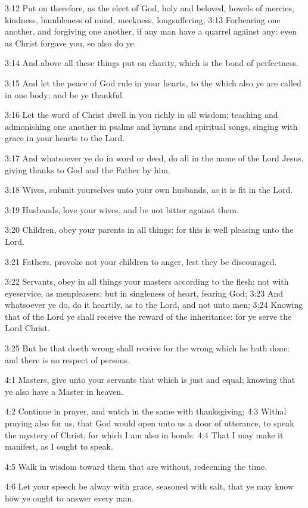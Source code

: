 3:12  Put on therefore, as the elect of God, holy and beloved, bowels of
mercies, kindness, humbleness of mind, meekness, longsuffering;
3:13  Forbearing one another, and forgiving one another, if any man have a
quarrel against any: even as Christ forgave you, so also do ye.

3:14  And above all these things put on charity, which is the bond of
perfectness.

3:15  And let the peace of God rule in your hearts, to the which also ye
are called in one body; and be ye thankful.

3:16  Let the word of Christ dwell in you richly in all wisdom; teaching
and admonishing one another in psalms and hymns and spiritual songs, singing
with grace in your hearts to the Lord.

3:17  And whatsoever ye do in word or deed, do all in the name of the Lord
Jesus, giving thanks to God and the Father by him.

3:18  Wives, submit yourselves unto your own husbands, as it is fit in the
Lord.

3:19  Husbands, love your wives, and be not bitter against them.

3:20  Children, obey your parents in all things: for this is well pleasing
unto the Lord.

3:21  Fathers, provoke not your children to anger, lest they be
discouraged.

3:22  Servants, obey in all things your masters according to the flesh; not
with eyeservice, as menpleasers; but in singleness of heart, fearing God;
3:23  And whatsoever ye do, do it heartily, as to the Lord, and not unto
men;
3:24  Knowing that of the Lord ye shall receive the reward of the
inheritance: for ye serve the Lord Christ.

3:25  But he that doeth wrong shall receive for the wrong which he hath
done: and there is no respect of persons.

4:1  Masters, give unto your servants that which is just and equal; knowing
that ye also have a Master in heaven.

4:2  Continue in prayer, and watch in the same with thanksgiving;
4:3  Withal praying also for us, that God would open unto us a door of
utterance, to speak the mystery of Christ, for which I am also in bonds:
4:4  That I may make it manifest, as I ought to speak.

4:5  Walk in wisdom toward them that are without, redeeming the time.

4:6  Let your speech be alway with grace, seasoned with salt, that ye may
know how ye ought to answer every man.

